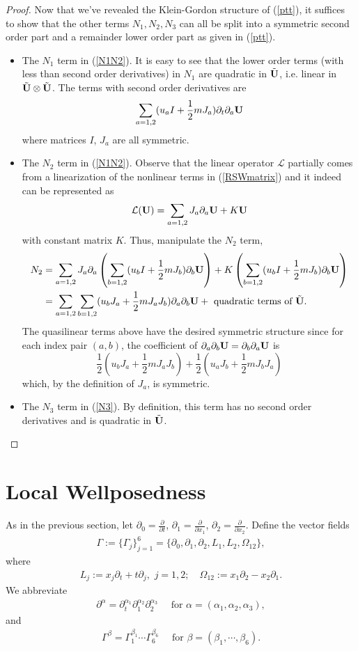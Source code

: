 \documentclass[12pt]{amsart}
\numberwithin{equation}{section} \numberwithin{theorem}{section}
\numberwithin{example}{section} \numberwithin{remark}{section}
\numberwithin{figure}{section} \numberwithin{algorithm}{section}
\def\vU{{\bf U}}
\def\vUd{\tilde{\vU}}
\def\pa{\partial}
\def\pt{\partial_t}
\def\dfrac{\displaystyle\frac}
\def\half{\dfrac{1}{2}}
\def\cL{{\mathcal L}}
\begin{document}
\begin{proof}
Now that we've revealed the Klein-Gordon structure of (\ref{ptt}),
it suffices to show that the other terms $N_1,N_2,N_3$ can all be
split into a symmetric second order part and a remainder lower order
part as given in (\ref{ptt}).
\begin{itemize}
\item The $N_1$ term in (\ref{N1N2}). It is easy to see that the lower
order terms (with less than second order derivatives) in $N_1$ are
quadratic in $\vUd$, i.e. linear in $\vUd\otimes\vUd$. The terms
with second order derivatives are
\[\sum_{a=1,2}(u_aI+\half mJ_a)\pt\pa_a\vU\]
where matrices $I$, $J_a$ are all symmetric. 
\item The $N_2$ term in (\ref{N1N2}).
Observe that the linear operator $\cL$ partially comes from a
linearization of the nonlinear terms in (\ref{RSWmatrix}) and it
indeed can be represented as
\[\cL(\vU)=\sum_{a=1,2}J_a\pa_a\vU+K\vU\]
with constant matrix $K$. Thus, manipulate the $N_2$ term,
\[\begin{split}
N_2&=\sum_{a=1,2}J_a\pa_a\left(\sum_{b=1,2}(u_bI+\half mJ_b)\pa_b\vU\right)
+K\left(\sum_{b=1,2}(u_bI+\half mJ_b)\pa_b\vU\right)\\
&=\sum_{a=1,2}\sum_{b=1,2}(u_bJ_{a}+\half mJ_{a}J_b)\pa_{a}\pa_b\vU+
\mbox{ quadratic terms of }\vUd.
\end{split}\]
The quasilinear terms above have the desired symmetric structure
since for each index pair $(a,b)$, the coefficient of
$\pa_{a}\pa_b\vU=\pa_b\pa_{a}\vU$ is
\[
\frac{1}{2}(u_bJ_{a}+\half
mJ_{a}J_b)+\frac{1}{2}(u_{a}J_{b}+\half mJ_{b}J_{a})
\]
which, by the definition of $J_a$, is symmetric.
\item The $N_3$ term in (\ref{N3}). By
definition, this term has no second order derivatives and is
quadratic in $\vUd$.
\end{itemize}
\end{proof}


\section{Local Wellposedness}

As in the previous section, let
$\pa_0=\frac{\pa}{\pa t}$, $\pa_1=\frac{\pa}{\pa x_1}$, $\pa_2=
\frac{\pa}{\pa x_2}$. Define the vector fields
\begin{align}\label{def:vfields}
\Gamma:=\{\Gamma_j\}_{j=1}^6=\{\pa_0,\pa_1,\pa_2, L_1, L_2,
\Omega_{12}\},
\end{align}
where
\begin{align*}
L_j:=x_j\pa_t+t\pa_j,\,\,j=1,2; \quad
\Omega_{12}:=x_1\pa_2-x_2\pa_1.
\end{align*}
We abbreviate
\begin{align*}
\pa^{\alpha}=\pa_t^{\alpha_1}\pa_1^{\alpha_2}\pa_2^{\alpha_3}
\quad\mbox{ for } \alpha=(\alpha_1,\alpha_2,\alpha_3),
\end{align*}
and
\begin{align*}
\Gamma^{\beta}=\Gamma_1^{\beta_1}\cdots\Gamma_6^{\beta_6}
\quad\mbox{ for } \beta=(\beta_1,\cdots, \beta_6).
\end{align*}
\end{document}
